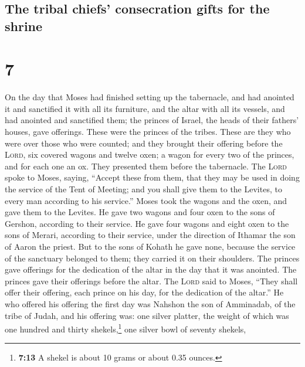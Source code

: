 \hypertarget{the-tribal-chiefs-consecration-gifts-for-the-shrine}{%
\subsection{The tribal chiefs' consecration gifts for the
shrine}\label{the-tribal-chiefs-consecration-gifts-for-the-shrine}}

\hypertarget{section-6}{%
\section{7}\label{section-6}}

 On the day that Moses had finished setting up the
tabernacle, and had anointed it and sanctified it with all its
furniture, and the altar with all its vessels, and had anointed and
sanctified them;  the princes of Israel, the heads of
their fathers' houses, gave offerings. These were the princes of the
tribes. These are they who were over those who were counted;
 and they brought their offering before the \textsc{Lord},
six covered wagons and twelve oxen; a wagon for every two of the
princes, and for each one an ox. They presented them before the
tabernacle.  The \textsc{Lord} spoke to Moses, saying,
 ``Accept these from them, that they may be used in doing
the service of the Tent of Meeting; and you shall give them to the
Levites, to every man according to his service.''  Moses
took the wagons and the oxen, and gave them to the Levites.
 He gave two wagons and four oxen to the sons of Gershon,
according to their service.  He gave four wagons and eight
oxen to the sons of Merari, according to their service, under the
direction of Ithamar the son of Aaron the priest.  But to
the sons of Kohath he gave none, because the service of the sanctuary
belonged to them; they carried it on their shoulders. 
The princes gave offerings for the dedication of the altar in the day
that it was anointed. The princes gave their offerings before the altar.
 The \textsc{Lord} said to Moses, ``They shall offer
their offering, each prince on his day, for the dedication of the
altar.''  He who offered his offering the first day was
Nahshon the son of Amminadab, of the tribe of Judah,  and
his offering was: one silver platter, the weight of which was one
hundred and thirty shekels,\footnote{\textbf{7:13} A shekel is about 10
  grams or about 0.35 ounces.} one silver bowl of seventy shekels,
